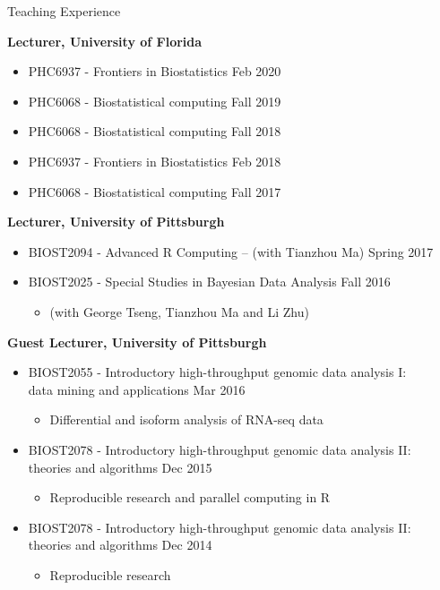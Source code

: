\documentclass{resume} %
\begin{document}
\begin{rSection}{Teaching Experience }

\textbf{Lecturer, University of Florida}
\begin{itemize}[noitemsep,topsep=0pt]
\item PHC6937 - Frontiers in Biostatistics \hfill Feb 2020
\item PHC6068 - Biostatistical computing \hfill Fall 2019
\item PHC6068 - Biostatistical computing \hfill Fall 2018
\item PHC6937 - Frontiers in Biostatistics \hfill Feb 2018
\item PHC6068 - Biostatistical computing \hfill Fall 2017
\end{itemize}


\textbf{Lecturer, University of Pittsburgh}
\begin{itemize}[noitemsep,topsep=0pt]
\item BIOST2094 - Advanced R Computing -- (with Tianzhou Ma) \hfill Spring 2017
\item BIOST2025 - Special Studies in Bayesian Data Analysis  \hfill Fall 2016
\begin{itemize}[noitemsep,topsep=0pt]
\item{(with George Tseng, Tianzhou Ma and Li Zhu)}
\end{itemize}
\end{itemize}


\textbf{Guest Lecturer, University of Pittsburgh}
\begin{itemize}[noitemsep,topsep=0pt]
\item BIOST2055 - Introductory high-throughput genomic data analysis I: \\data mining and applications \hfill Mar 2016
\begin{itemize}[noitemsep,topsep=0pt]
\item{Differential and isoform analysis of RNA-seq data}
\end{itemize}
\item BIOST2078 - Introductory high-throughput genomic data analysis II: \\theories and algorithms  \hfill Dec 2015
\begin{itemize}[noitemsep,topsep=0pt]
\item{Reproducible research and parallel computing in R}
\end{itemize}
\item BIOST2078 - Introductory high-throughput genomic data analysis II: \\theories and algorithms  \hfill Dec 2014
\begin{itemize}[noitemsep,topsep=0pt]
\item{Reproducible research}
\end{itemize}
\end{itemize}


\end{rSection}
\end{document}

